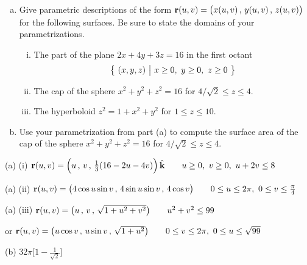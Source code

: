 \begin{question}[M317 2011A] %
\begin{enumerate}[(a)]
\item
Give parametric descriptions of the form 
$\mathbf{r}(u, v) = \big(x(u,v)\,,\, y(u,v)\,,\, z(u,v)\big)$ 
for the following surfaces. Be sure to state the domains of your 
parametrizations.
\begin{enumerate}[(i)]
\item
The part of the plane $2x + 4y + 3z = 16$ in the first octant 
$$
\big\{ \ (x, y, z)\ \big|\  x \ge 0,\  y \ge 0,\  z \ge 0\ \big\}
$$
\item
The cap of the sphere $x^2 + y^2 + z^2 = 16$ for $4/\sqrt{2} \le z \le 4$.
\item
The hyperboloid $z^2 = 1 + x^2 + y^2$ for $1 \le z \le 10$.
\end{enumerate}

\item
Use your parametrization from part (a) to compute the surface area 
of the cap of the sphere $x^2 + y^2 + z^2 = 16$ for $4/\sqrt{2} \le z \le 4$.
\end{enumerate}
\end{question}

%

\begin{answer} 
(a) (i) $\mathbf{r}(u,v) = \Big(u\,,\, v\,,\, \frac{1}{3}(16-2u-4v)\Big)\,\hat{\mathbf{k}}\qquad
u\ge 0,\ v\ge 0,\ u+2v\le 8$


(a) (ii) $\mathbf{r}(u,v) = \big(4\cos u\sin v\,,\,
                     4\sin u\sin v\,,\,
                     4\cos v\big)\qquad
           0\le u\le 2\pi,\ 0\le v\le \frac{\pi}{4}$

(a) (iii) $\mathbf{r}(u,v) = \big(u\,,\, v\,,\, \sqrt{1 + u^2 + v^2}\big)\qquad
u^2+v^2\le 99$

or $\mathbf{r}(u,v) = \big(u\cos v\,,\, u\sin v\,,\, \sqrt{1 + u^2}\big)\qquad
0\le v\le 2\pi,\ 0\le u\le\sqrt{99}$

(b) $32\pi\Big[1-\frac{1}{\sqrt{2}}\Big]$
\end{answer}

